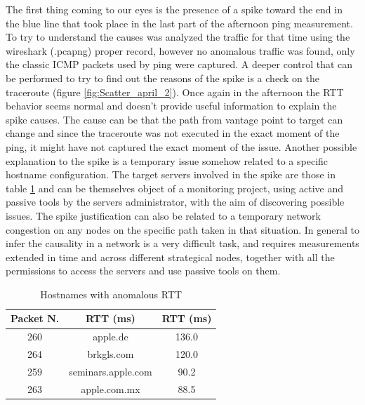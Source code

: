 \documentclass[a4paper,10pt]{article}
\begin{document}
\begin{multicols}{2}

\noindent
The first thing coming to our eyes is the presence of a spike toward the end in the blue line 
that took place in the last part of the afternoon ping measurement. To try to understand the causes was analyzed the traffic 
for that time using the wireshark (.pcapng) proper record, however no anomalous traffic was found, only the classic ICMP packets used by ping were captured.
A deeper control that can be performed to try to find out the reasons of the spike is a check on the traceroute (figure \ref{fig:Scatter_april_2}). Once again 
in the afternoon the RTT behavior seems normal and doesn't provide useful information to explain the spike causes. The cause can be that the path from vantage point to target
can change and since the traceroute was not executed in the exact moment of the ping, it might have not captured the exact moment of the issue.
Another possible explanation to the spike is a temporary issue somehow related to a specific hostname configuration.
The target servers involved in the spike are those in table \ref{tab:anomalous_RTT} and can be themselves object of a monitoring project, using active and passive 
tools by the servers administrator, with the aim of discovering possible issues. The spike justification can also be related to a temporary network 
congestion on any nodes on the specific path taken in that situation. 
In general to infer the causality in a network is a very difficult task, and requires
measurements extended in time and across different strategical nodes, together with all the permissions to access the servers and use passive tools on them.\\

        \begin{table}[H]
                \centering
                \caption{\small Hostnames with anomalous RTT}
                \vspace{0.3cm}
                \begin{tabular}{|c|c|c|} \hline
                \textbf{Packet N.} & \textbf{RTT (ms)} & \textbf{RTT (ms)}\\ \hline
                260 & apple.de & 136.0 \\ \hline
                264 & brkgls.com & 120.0 \\ \hline
                259 & seminars.apple.com & 90.2 \\ \hline
                263 & apple.com.mx & 88.5 \\ \hline
                \end{tabular}
                \label{tab:anomalous_RTT}
        \end{table}


\end{multicols}
\end{document}

